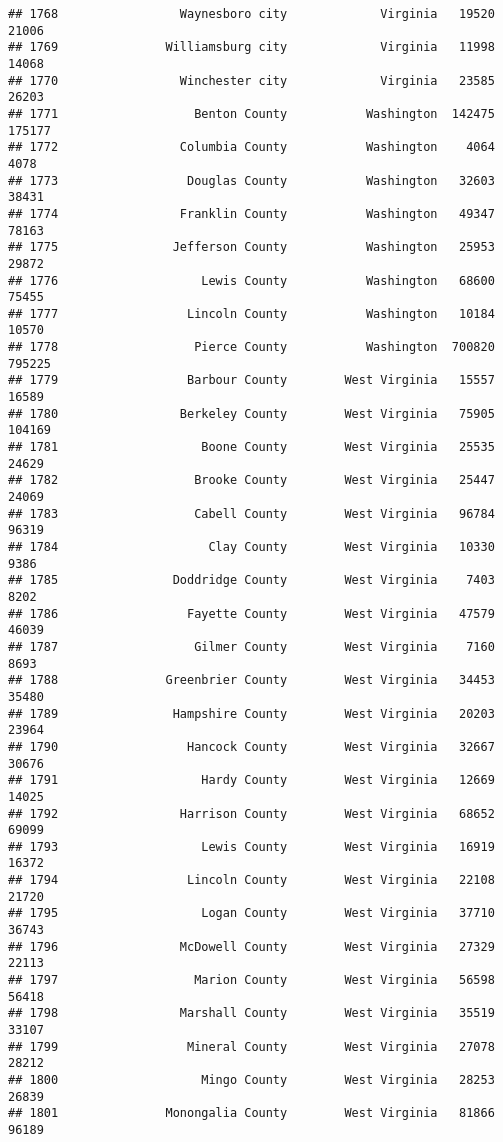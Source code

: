 \documentclass[
]{article}
\begin{document}
\begin{verbatim}
## 1768                 Waynesboro city             Virginia   19520   21006
## 1769               Williamsburg city             Virginia   11998   14068
## 1770                 Winchester city             Virginia   23585   26203
## 1771                   Benton County           Washington  142475  175177
## 1772                 Columbia County           Washington    4064    4078
## 1773                  Douglas County           Washington   32603   38431
## 1774                 Franklin County           Washington   49347   78163
## 1775                Jefferson County           Washington   25953   29872
## 1776                    Lewis County           Washington   68600   75455
## 1777                  Lincoln County           Washington   10184   10570
## 1778                   Pierce County           Washington  700820  795225
## 1779                  Barbour County        West Virginia   15557   16589
## 1780                 Berkeley County        West Virginia   75905  104169
## 1781                    Boone County        West Virginia   25535   24629
## 1782                   Brooke County        West Virginia   25447   24069
## 1783                   Cabell County        West Virginia   96784   96319
## 1784                     Clay County        West Virginia   10330    9386
## 1785                Doddridge County        West Virginia    7403    8202
## 1786                  Fayette County        West Virginia   47579   46039
## 1787                   Gilmer County        West Virginia    7160    8693
## 1788               Greenbrier County        West Virginia   34453   35480
## 1789                Hampshire County        West Virginia   20203   23964
## 1790                  Hancock County        West Virginia   32667   30676
## 1791                    Hardy County        West Virginia   12669   14025
## 1792                 Harrison County        West Virginia   68652   69099
## 1793                    Lewis County        West Virginia   16919   16372
## 1794                  Lincoln County        West Virginia   22108   21720
## 1795                    Logan County        West Virginia   37710   36743
## 1796                 McDowell County        West Virginia   27329   22113
## 1797                   Marion County        West Virginia   56598   56418
## 1798                 Marshall County        West Virginia   35519   33107
## 1799                  Mineral County        West Virginia   27078   28212
## 1800                    Mingo County        West Virginia   28253   26839
## 1801               Monongalia County        West Virginia   81866   96189

\end{verbatim}
\end{document}
